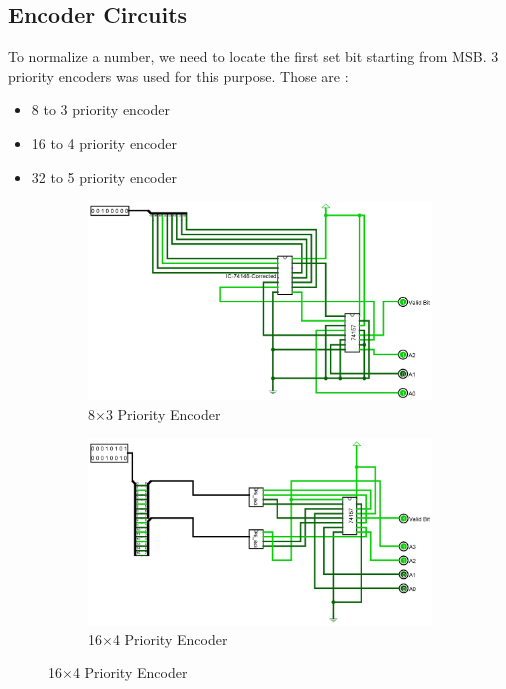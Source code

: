 \documentclass[12pt]{article}
\begin{document}
\subsection{Encoder Circuits}
To normalize a number, we need to locate the first set bit starting from MSB. 3 priority encoders was used for this purpose. Those are :
\begin{itemize}
    \item 8 to 3 priority encoder 
    \item 16 to 4 priority encoder 
    \item 32 to 5 priority encoder 
\end{itemize}
\begin{figure}[H]
    \centering
    \begin{subfigure}[b]{0.45\textwidth}
        \includegraphics[width=\textwidth]{images/PE_8x3.jpg}
        \caption{8$\times$3 Priority Encoder}
        \label{fig:8x3prioenc}
    \end{subfigure}
    \begin{subfigure}[b]{0.45\textwidth}
        \includegraphics[width=\textwidth]{images/PE_16x4.jpg}
        \caption{16$\times$4 Priority Encoder}

\end{subfigure}
\end{figure}
\end{document}
